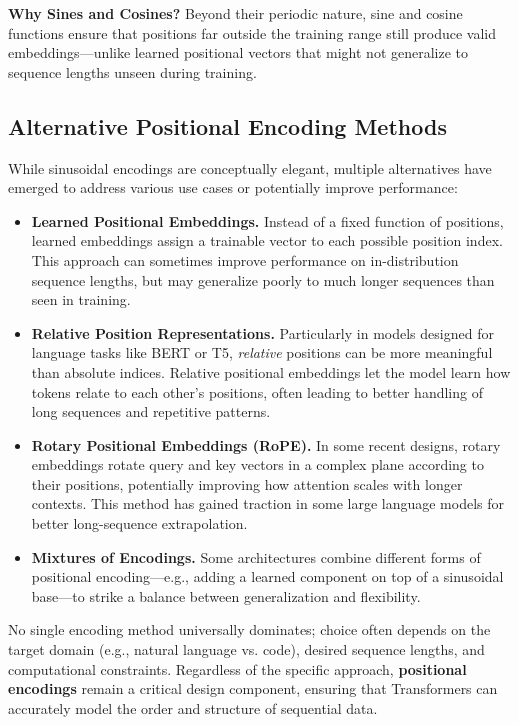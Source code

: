 \noindent
\textbf{Why Sines and Cosines?} Beyond their periodic nature, sine and cosine functions ensure that positions far outside the training range still produce valid embeddings—unlike learned positional vectors that might not generalize to sequence lengths unseen during training.

\subsection{Alternative Positional Encoding Methods}
\noindent
While sinusoidal encodings are conceptually elegant, multiple alternatives have emerged to address various use cases or potentially improve performance:
\begin{itemize}
    \item \textbf{Learned Positional Embeddings.}
    Instead of a fixed function of positions, learned embeddings assign a trainable vector to each possible position index. This approach can sometimes improve performance on in-distribution sequence lengths, but may generalize poorly to much longer sequences than seen in training.

    \item \textbf{Relative Position Representations.}
    Particularly in models designed for language tasks like BERT or T5, \emph{relative} positions can be more meaningful than absolute indices. Relative positional embeddings let the model learn how tokens relate to each other’s positions, often leading to better handling of long sequences and repetitive patterns.

    \item \textbf{Rotary Positional Embeddings (RoPE).}
    In some recent designs, rotary embeddings rotate query and key vectors in a complex plane according to their positions, potentially improving how attention scales with longer contexts. This method has gained traction in some large language models for better long-sequence extrapolation.

    \item \textbf{Mixtures of Encodings.}
    Some architectures combine different forms of positional encoding—e.g., adding a learned component on top of a sinusoidal base—to strike a balance between generalization and flexibility.
\end{itemize}

\noindent
No single encoding method universally dominates; choice often depends on the target domain (e.g., natural language vs. code), desired sequence lengths, and computational constraints. Regardless of the specific approach, \textbf{positional encodings} remain a critical design component, ensuring that Transformers can accurately model the order and structure of sequential data.

